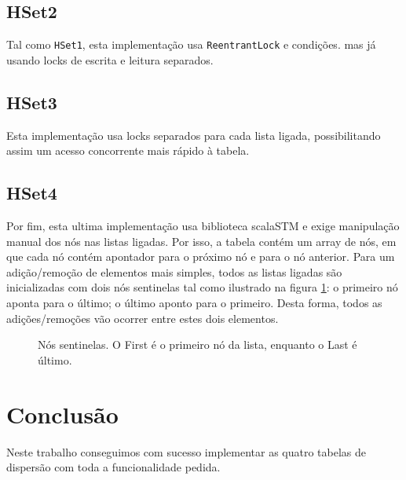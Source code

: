 \documentclass{report}
\begin{document}
\subsection{HSet2}
Tal como \texttt{HSet1}, esta implementação usa \texttt{ReentrantLock} e condições. mas já usando locks de escrita e leitura separados.

\subsection{HSet3}
Esta implementação usa locks separados para cada lista ligada, possibilitando assim um acesso concorrente mais rápido à tabela.

\subsection{HSet4}
Por fim, esta ultima implementação usa biblioteca scalaSTM e exige manipulação manual dos nós nas listas ligadas. Por isso, a tabela contém um array de nós, em que cada nó contém apontador para o próximo nó e para o nó anterior. Para um adição/remoção de elementos mais simples, todos as listas ligadas são inicializadas com dois nós sentinelas tal como ilustrado na figura \ref{sentinels}: o primeiro nó aponta para o último; o último aponto para o primeiro. Desta forma, todos as adições/remoções vão ocorrer entre estes dois elementos.

\begin{figure}[!h]
  \centering
  \caption{ \centering Nós sentinelas. O First é o primeiro nó da lista, enquanto o Last é último. }
  \label{sentinels}
\end{figure}

\section{Conclusão}
Neste trabalho conseguimos com sucesso implementar as quatro tabelas de dispersão com toda a funcionalidade pedida.
\end{document}
